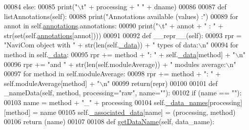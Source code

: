 \begin{DoxyCode}
00084                 \textcolor{keywordflow}{else}:
00085                     \textcolor{keywordflow}{print}(\textcolor{stringliteral}{"\(\backslash\)t"} + processing + \textcolor{stringliteral}{" "} + dname)
00086 
00087     \textcolor{keyword}{def }listAnnotations(self):
00088         \textcolor{keywordflow}{print}(\textcolor{stringliteral}{"Annotations available (values) :"})
00089         \textcolor{keywordflow}{for} annot \textcolor{keywordflow}{in} self.\hyperlink{classnavicom_1_1navicom_1_1NaviCom_a0386d881214943cf3432d0ffe22cbb71}{annotations}.annotations:
00090             \textcolor{keywordflow}{print}(\textcolor{stringliteral}{"\(\backslash\)t"} + annot + \textcolor{stringliteral}{" : "} + str(set(self.\hyperlink{classnavicom_1_1navicom_1_1NaviCom_a0386d881214943cf3432d0ffe22cbb71}{annotations}[annot])))
00091 
00092     \textcolor{keyword}{def }\_\_repr\_\_(self):
00093         rpr = \textcolor{stringliteral}{"NaviCom object with "} + str(len(self.\hyperlink{classnavicom_1_1navicom_1_1NaviCom_a407b2b5c30a5652ee85c4be54b3e6679}{_data})) + \textcolor{stringliteral}{" types of data:\(\backslash\)n"
      }
00094         \textcolor{keywordflow}{for} method \textcolor{keywordflow}{in} self.\hyperlink{classnavicom_1_1navicom_1_1NaviCom_a407b2b5c30a5652ee85c4be54b3e6679}{_data}:
00095             rpr += method + \textcolor{stringliteral}{": "} + self.\hyperlink{classnavicom_1_1navicom_1_1NaviCom_a407b2b5c30a5652ee85c4be54b3e6679}{_data}[method] + \textcolor{stringliteral}{"\(\backslash\)n"}
00096         rpr += \textcolor{stringliteral}{"and "} + str(len(self.moduleAverage)) + \textcolor{stringliteral}{" modules average:\(\backslash\)n"}
00097         \textcolor{keywordflow}{for} method \textcolor{keywordflow}{in} self.moduleAverage:
00098             rpr += method + \textcolor{stringliteral}{": "} + self.moduleAverage[method] + \textcolor{stringliteral}{"\(\backslash\)n"}
00099         \textcolor{keywordflow}{return}(repr)
00100     
00101     \textcolor{keyword}{def }\_nameData(self, method, processing="raw", name=""):
00102         \textcolor{keywordflow}{if} (name == \textcolor{stringliteral}{""}):
00103             name = method + \textcolor{stringliteral}{"\_"} + processing
00104         self.\hyperlink{classnavicom_1_1navicom_1_1NaviCom_ab8c34ab1a6d2a23f9b9ecee65375317a}{_data_names}[processing][method] = name
00105         self.\hyperlink{classnavicom_1_1navicom_1_1NaviCom_a2e1d67aee497222ac3e508f6812d6a10}{_associated_data}[name] = (processing, method)
00106         \textcolor{keywordflow}{return} (name)
00107 
00108     \textcolor{keyword}{def }\hyperlink{classnavicom_1_1navicom_1_1NaviCom_a51ecb41beebc7636bde73be2e1ffc407}{getDataName}(self, data\_name):

\end{DoxyCode}
